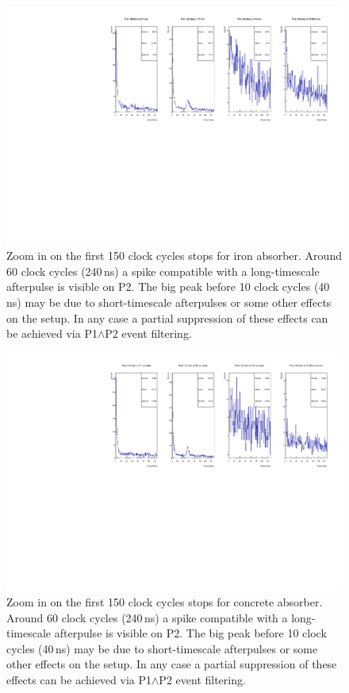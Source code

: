 \documentclass[../main.tex]{subfiles}
\begin{document}
     \begin{figure}[htb!]
         \centering
         \includegraphics[width=\linewidth]{images/first_150_iron_bins.pdf}
         \caption{Zoom in on the first 150 clock cycles stops for iron absorber. Around 60 clock cycles (\textnormal{240\,ns}) a spike compatible with a long-timescale afterpulse is visible on P2. The big peak before 10  clock cycles (\textnormal{40\,ns}) may be due to short-timescale  afterpulses or some other effects on the setup. In any case a partial suppression of these effects can be achieved via P1$\land$P2 event filtering.}
         \label{fig:150iron}
     \end{figure}

      \begin{figure}[htb!]
         \centering
         \includegraphics[width=\linewidth]{images/first_150_concrete_bins.pdf}
         \caption{Zoom in on the first 150 clock cycles stops for concrete absorber. Around 60 clock cycles (\textnormal{240\,ns}) a spike compatible with a long-timescale afterpulse is visible on P2. The big peak before 10  clock cycles (\textnormal{40\,ns}) may be due to short-timescale  afterpulses or some other effects on the setup. In any case a partial suppression of these effects can be achieved via P1$\land$P2 event filtering.}
         \label{fig:150concrete}
     \end{figure}
\end{document}
